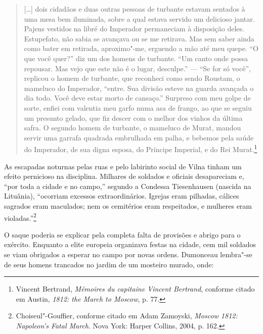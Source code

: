\begin{quote}
[\ldots{}] dois cidadãos e duas outras pessoas de turbante estavam
sentados à uma mesa bem iluminada, sobre a qual estava servido um
delicioso jantar. Pajens vestidos na libré do Imperador permaneciam à
disposição deles. Estupefato, não sabia se avançava ou se me retirava.
Mas sem saber ainda como bater em retirada, aproximo"-me, erguendo a mão
até meu quepe. ``O que você quer?'' diz um dos homens de turbante. ``Um
canto onde possa repousar. Mas vejo que este não é o lugar, desculpe.'' ---
``Se for só você'', replicou o homem de turbante, que reconheci como sendo
Roustam, o mameluco do Imperador, ``entre. Sua divisão esteve na guarda
avançada o dia todo. Você deve estar morto de cansaço.'' Surpreso com meu
golpe de sorte, enfiei com valentia meu garfo numa asa de frango, ao que
se seguiu um presunto gelado, que fiz descer com o melhor dos vinhos da
última safra. O segundo homem de turbante, o mameluco de Murat, mandou
servir uma garrafa quadrada embrulhada em palha, e bebemos pela saúde do
Imperador, de sua digna esposa, do Príncipe Imperial, e do Rei
Murat.\footnote{Vincent Bertrand, \textit{Mémoires du capitaine Vincent Bertrand}, conforme citado em Austin, \textit{1812: the March to Moscow}, p. 77.} 
\end{quote}

As escapadas noturnas pelas ruas e pelo labirinto social de Vilna tinham
um efeito pernicioso na disciplina. Milhares de soldados e oficiais
desapareciam e, ``por toda a cidade e no campo,'' segundo a Condessa
Tiesenhausen (nascida na Lituânia), ``ocorriam excessos extraordinários.
Igrejas eram pilhadas, cálices sagrados eram maculados; nem os
cemitérios eram respeitados, e mulheres eram violadas.''\footnote{Choiseul"-Gouffier, conforme citado em Adam Zamoyski, \textit{Moscow 1812: Napoleon's Fatal March}. Nova York: Harper Collins, 2004, p. 162.}

O saque poderia se explicar pela completa falta de provisões e abrigo
para o exército. Enquanto a elite europeia organizava festas na cidade,
cem mil soldados se viam obrigados a esperar no campo por novas ordens.
Dumonceau lembra"-se de seus homens trancados no jardim de um mosteiro
murado, onde:

